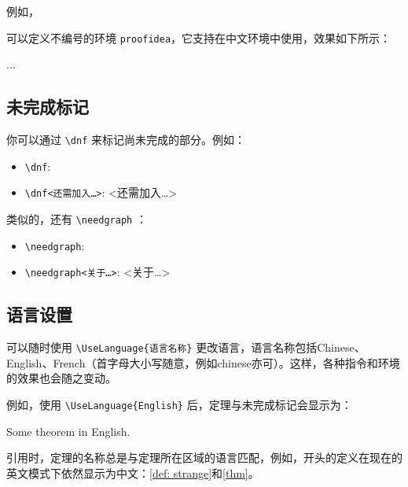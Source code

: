 \documentclass{lebhart}
\begin{document}
\def\proofideanameCN{思路}

例如，

\begin{code}
  \def\proofideanameCN{思路}
\end{code}
可以定义不编号的环境 \lstinline|proofidea|，它支持在中文环境中使用，效果如下所示：

\begin{proofidea}
    ...
\end{proofidea}

\subsection{未完成标记}

你可以通过 \lstinline|\dnf| 来标记尚未完成的部分。例如：
\begin{itemize}
    \item \lstinline|\dnf|: \quad \dnf
    \item \lstinline|\dnf<还需加入…>|: \quad \dnf<还需加入…>
\end{itemize}

类似的，还有 \lstinline|\needgraph| ：
\begin{itemize}
    \item \lstinline|\needgraph|: \needgraph
    \item \lstinline|\needgraph<关于…>|: \needgraph<关于…>
\end{itemize}

\subsection{语言设置}
可以随时使用 \lstinline|\UseLanguage{语言名称}| 更改语言，语言名称包括Chinese、English、French（首字母大小写随意，例如chinese亦可）。这样，各种指令和环境的效果也会随之变动。

例如，使用 \lstinline|\UseLanguage{English}| 后，定理与未完成标记会显示为：

\begin{theorem}[Useless]\label{thm}
    Some theorem in English. \dnf
\end{theorem}

引用时，定理的名称总是与定理所在区域的语言匹配，例如，开头的定义在现在的英文模式下依然显示为中文：\cref{def: strange}和\cref{thm}。

\end{document}
